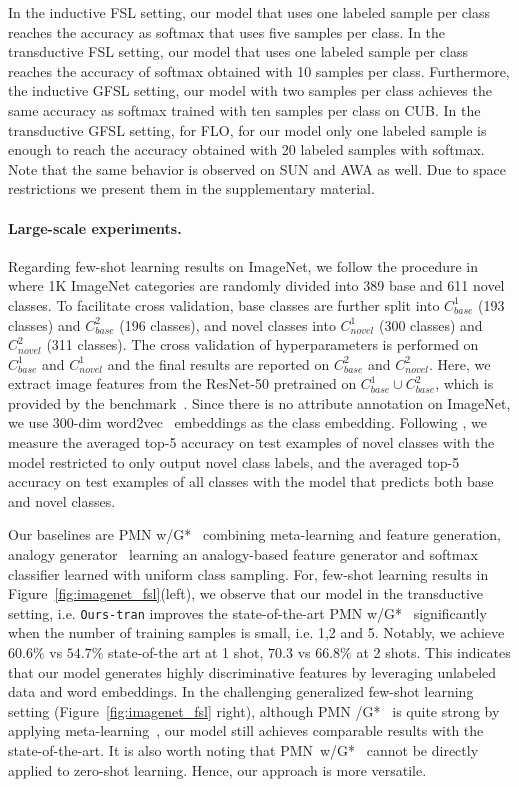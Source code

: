 \documentclass[10pt,twocolumn,letterpaper]{article}
\begin{document}
In the inductive FSL setting, our model that uses one labeled sample per class reaches the accuracy as softmax that uses five samples per class. In the transductive FSL setting, our model that uses one labeled sample per class reaches the accuracy of softmax obtained with 10 samples per class. Furthermore, the inductive GFSL setting, our model with two samples per class achieves the same accuracy as softmax trained with ten samples per class on CUB. In the transductive GFSL setting, for FLO, for our model only one labeled sample is enough to reach the accuracy obtained with 20 labeled samples with softmax. Note that the same behavior is observed on SUN and AWA as well. Due to space restrictions we present them in the supplementary material.

\paragraph{Large-scale experiments.} 
Regarding few-shot learning results on ImageNet, we follow the procedure in~\cite{HG16} where 1K ImageNet categories are randomly divided into 389 base and 611 novel classes. To facilitate cross validation, base classes are further split into $C^1_{base}$ (193 classes) and $C^2_{base}$ (196 classes), and novel classes into $C^1_{novel}$ (300 classes) and $C^2_{novel}$ (311 classes). The cross validation of hyperparameters is performed on $C^1_{base}$  and $C^1_{novel}$ and the final results are reported on $C^2_{base}$  and $C^2_{novel}$. Here, we extract image features from the ResNet-50 pretrained on $C^1_{base}\cup C^2_{base}$, which is provided by the benchmark~\cite{HG16}. Since there is no attribute annotation on ImageNet, we use 300-dim word2vec~\cite{MSCCD13} embeddings as the class embedding. Following \cite{wang2018low}, we measure the averaged top-5 accuracy on test examples of novel classes with the model restricted to only output novel class labels, and the averaged top-5 accuracy on test examples of all classes with the model that predicts both base and novel classes. 

Our baselines are PMN w/G*~\cite{wang2018low} combining meta-learning and feature generation, analogy generator~\cite{HG16} learning an analogy-based feature generator and softmax classifier learned with uniform class sampling. For, few-shot learning results in Figure~\ref{fig:imagenet_fsl}(left), we observe that our model in the transductive setting, i.e. \texttt{Ours-tran} improves the state-of-the-art PMN w/G*~\cite{wang2018low} significantly when the number of training samples is small, i.e. 1,2 and 5. Notably, we achieve $60.6\%$ vs $54.7\%$ state-of-the art at 1 shot, $70.3$ vs $66.8\%$ at 2 shots. This indicates that our model generates highly discriminative features by leveraging unlabeled data and word embeddings. In the challenging generalized few-shot learning setting (Figure~\ref{fig:imagenet_fsl} right), although PMN /G*~\cite{wang2018low} is quite strong by applying meta-learning~\cite{snell2017prototypical}, our model still achieves comparable results with the state-of-the-art. It is also worth noting that PMN~w/G*~\cite{wang2018low} cannot be directly applied to zero-shot learning. Hence, our approach is more versatile.
\end{document}
